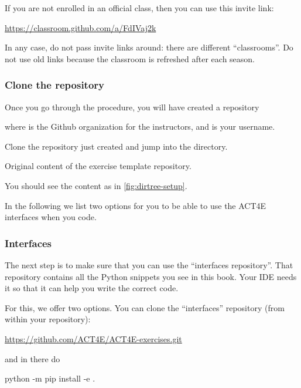 If you are not enrolled in an official class, then you can use this invite link:

\url{https://classroom.github.com/a/FdIVaj2k}

In any case, do not pass invite links around: there are different ``classrooms''.
Do not use old links because the classroom is refreshed after each season.

\subsubsection{Clone the repository}

Once you go through the procedure, you will have created a repository

\begin{quote}
\end{quote}
where  is the Github organization for the instructors, and  is your username.

Clone the repository just created and jump into the directory.

\begin{marginfigure}
    \caption{Original content of the exercise template repository.}
    \label{fig:dirtree-setup}
\end{marginfigure}

You should see the content as in \cref{fig:dirtree-setup}.

In the following we list two options for you to be able to use the ACT4E interfaces when you code.

\subsubsection{Interfaces}

The next step is to make sure that you can use the ``interfaces repository''.
That repository contains all the Python snippets you see in this book.
Your IDE needs it so that it can help you write the correct code.

For this, we offer two options.
You can clone the ``interfaces'' repository (from within your repository):

\url{https://github.com/ACT4E/ACT4E-exercises.git}

and in there do

\begin{console}
    python -m pip install -e .
\end{console}

